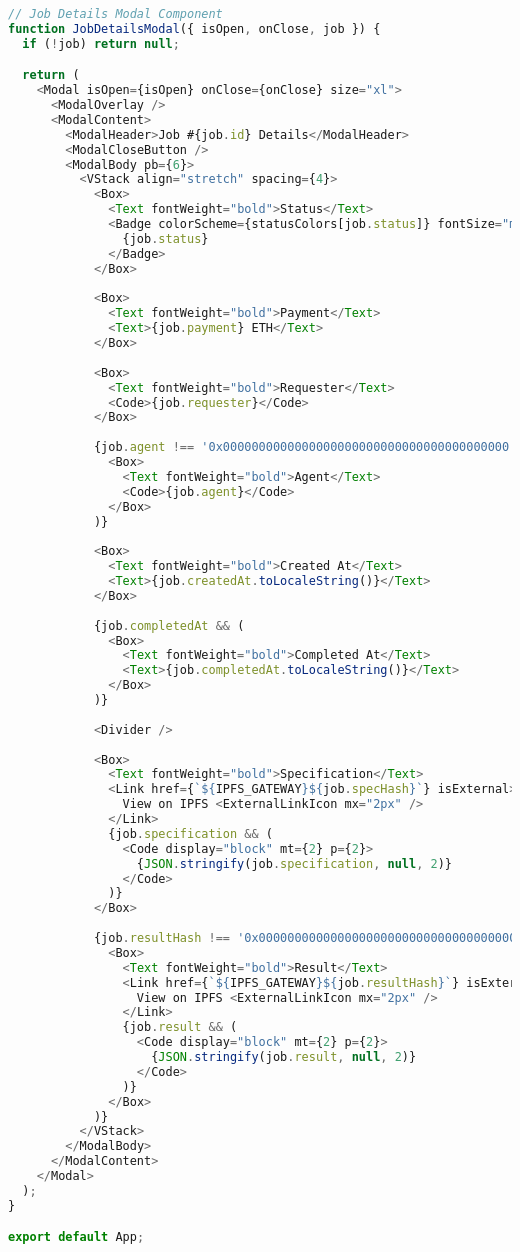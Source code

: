 \begin{lstlisting}[language=JavaScript,caption={App.jsx - Main React Application}]
// Job Details Modal Component
function JobDetailsModal({ isOpen, onClose, job }) {
  if (!job) return null;

  return (
    <Modal isOpen={isOpen} onClose={onClose} size="xl">
      <ModalOverlay />
      <ModalContent>
        <ModalHeader>Job #{job.id} Details</ModalHeader>
        <ModalCloseButton />
        <ModalBody pb={6}>
          <VStack align="stretch" spacing={4}>
            <Box>
              <Text fontWeight="bold">Status</Text>
              <Badge colorScheme={statusColors[job.status]} fontSize="md">
                {job.status}
              </Badge>
            </Box>
            
            <Box>
              <Text fontWeight="bold">Payment</Text>
              <Text>{job.payment} ETH</Text>
            </Box>
            
            <Box>
              <Text fontWeight="bold">Requester</Text>
              <Code>{job.requester}</Code>
            </Box>
            
            {job.agent !== '0x0000000000000000000000000000000000000000' && (
              <Box>
                <Text fontWeight="bold">Agent</Text>
                <Code>{job.agent}</Code>
              </Box>
            )}
            
            <Box>
              <Text fontWeight="bold">Created At</Text>
              <Text>{job.createdAt.toLocaleString()}</Text>
            </Box>
            
            {job.completedAt && (
              <Box>
                <Text fontWeight="bold">Completed At</Text>
                <Text>{job.completedAt.toLocaleString()}</Text>
              </Box>
            )}
            
            <Divider />
            
            <Box>
              <Text fontWeight="bold">Specification</Text>
              <Link href={`${IPFS_GATEWAY}${job.specHash}`} isExternal>
                View on IPFS <ExternalLinkIcon mx="2px" />
              </Link>
              {job.specification && (
                <Code display="block" mt={2} p={2}>
                  {JSON.stringify(job.specification, null, 2)}
                </Code>
              )}
            </Box>
            
            {job.resultHash !== '0x0000000000000000000000000000000000000000000000000000000000000000' && (
              <Box>
                <Text fontWeight="bold">Result</Text>
                <Link href={`${IPFS_GATEWAY}${job.resultHash}`} isExternal>
                  View on IPFS <ExternalLinkIcon mx="2px" />
                </Link>
                {job.result && (
                  <Code display="block" mt={2} p={2}>
                    {JSON.stringify(job.result, null, 2)}
                  </Code>
                )}
              </Box>
            )}
          </VStack>
        </ModalBody>
      </ModalContent>
    </Modal>
  );
}

export default App;
\end{lstlisting}

